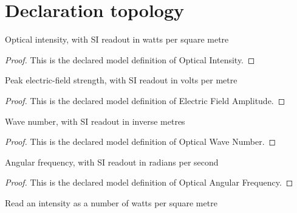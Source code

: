 \section{Declaration topology}
\begin{definition}
  \label{def:physics:phyx-mini-0104:phyxminiproblems-problemphyxmini0104-opticalintensity}
  Optical intensity, with SI readout in watts per square metre
\end{definition}
\begin{proof}
  This is the declared model definition of Optical Intensity.
\end{proof}
\begin{definition}
  \label{def:physics:phyx-mini-0104:phyxminiproblems-problemphyxmini0104-electricfieldamplitude}
  Peak electric-field strength, with SI readout in volts per metre
\end{definition}
\begin{proof}
  This is the declared model definition of Electric Field Amplitude.
\end{proof}
\begin{definition}
  \label{def:physics:phyx-mini-0104:phyxminiproblems-problemphyxmini0104-opticalwavenumber}
  Wave number, with SI readout in inverse metres
\end{definition}
\begin{proof}
  This is the declared model definition of Optical Wave Number.
\end{proof}
\begin{definition}
  \label{def:physics:phyx-mini-0104:phyxminiproblems-problemphyxmini0104-opticalangularfrequency}
  Angular frequency, with SI readout in radians per second
\end{definition}
\begin{proof}
  This is the declared model definition of Optical Angular Frequency.
\end{proof}
\begin{definition}
  \label{def:physics:phyx-mini-0104:phyxminiproblems-problemphyxmini0104-intensityinwattspersquaremeter}
  Read an intensity as a number of watts per square metre
\end{definition}
